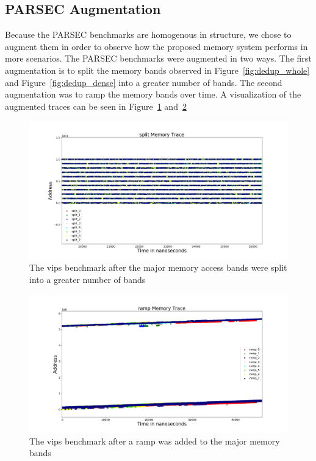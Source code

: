 \subsection{PARSEC Augmentation}
Because the PARSEC benchmarks are homogenous in structure, we chose to augment them in order to observe how the proposed memory system performs in more scenarios. The PARSEC benchmarks were augmented in two ways. The first augmentation is to split the memory bands observed in Figure~\ref{fig:dedup_whole} and Figure~\ref{fig:dedup_dense} into a greater number of bands. The second augmentation was to ramp the memory bands over time. A visualization of the augmented traces can be seen in Figure~\ref{fig:vips_split} and~\ref{fig:vips_ramp}

\begin{figure}[htbp]
		\includegraphics[width=\linewidth]{fig/vips_split.png}
		\caption{The vips benchmark after the major memory access bands were split into a greater number of bands}
		\label{fig:vips_split}
\end{figure}


\begin{figure}[htbp]
		\includegraphics[width=\linewidth]{fig/vips_ramp.png}
		\caption{The vips benchmark after a ramp was added to the major memory bands}
		\label{fig:vips_ramp}
\end{figure}

